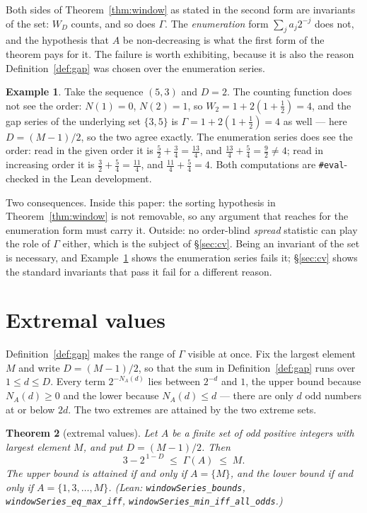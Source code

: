 \documentclass[11pt,a4paper]{article}
\theoremstyle{plain}
\newtheorem{theorem}{Theorem}[section]
\theoremstyle{definition}
\newtheorem{example}[theorem]{Example}
\theoremstyle{remark}
\newcommand{\Lean}[1]{\texttt{#1}}
\begin{document}
Both sides of Theorem~\ref{thm:window} as stated in the second form are
invariants of the set: $W_D$ counts, and so does $\Gamma$. The
\emph{enumeration} form $\sum_ja_j2^{-j}$ does not, and the hypothesis that $A$
be non-decreasing is what the first form of the theorem pays for it. The
failure is worth exhibiting, because it is also the reason
Definition~\ref{def:gap} was chosen over the enumeration series.

\begin{example}\label{ex:order}
Take the sequence $(5,3)$ and $D=2$. The counting function does not see the
order: $N(1)=0$, $N(2)=1$, so $W_2=1+2(1+\tfrac12)=4$, and the gap series of the
underlying set $\{3,5\}$ is $\Gamma=1+2(1+\tfrac12)=4$ as well --- here
$D=(M-1)/2$, so the two agree exactly. The enumeration series does see the
order: read in the given order it is
$\tfrac52+\tfrac34=\tfrac{13}4$, and $\tfrac{13}4+\tfrac54=\tfrac92\ne4$; read
in increasing order it is $\tfrac32+\tfrac54=\tfrac{11}4$, and
$\tfrac{11}4+\tfrac54=4$. Both computations are \Lean{\#eval}-checked in the
Lean development.
\end{example}

Two consequences. Inside this paper: the sorting hypothesis in
Theorem~\ref{thm:window} is not removable, so any argument that reaches for the
enumeration form must carry it. Outside: no order-blind \emph{spread}
statistic can play the role of $\Gamma$ either, which is the subject of
\S\ref{sec:cv}. Being an invariant of the set is necessary, and
Example~\ref{ex:order} shows the enumeration series fails it; \S\ref{sec:cv}
shows the standard invariants that pass it fail for a different reason.

\section{Extremal values}\label{sec:extremal}

Definition~\ref{def:gap} makes the range of $\Gamma$ visible at once. Fix the
largest element $M$ and write $D=(M-1)/2$, so that the sum in
Definition~\ref{def:gap} runs over $1\le d\le D$. Every term $2^{-N_A(d)}$ lies
between $2^{-d}$ and $1$, the upper bound because $N_A(d)\ge0$ and the lower
because $N_A(d)\le d$ --- there are only $d$ odd numbers at or below $2d$. The
two extremes are attained by the two extreme sets.

\begin{theorem}[extremal values]\label{thm:extremal}
Let $A$ be a finite set of odd positive integers with largest element $M$, and
put $D=(M-1)/2$. Then
\[
  3-2^{\,1-D}\;\le\;\Gamma(A)\;\le\;M .
\]
The upper bound is attained if and only if $A=\{M\}$, and the lower bound if and
only if $A=\{1,3,\dots,M\}$.
\textup{(Lean: \Lean{windowSeries\_bounds}, \Lean{windowSeries\_eq\_max\_iff},
\Lean{windowSeries\_min\_iff\_all\_odds}.)}
\end{theorem}
\end{document}
